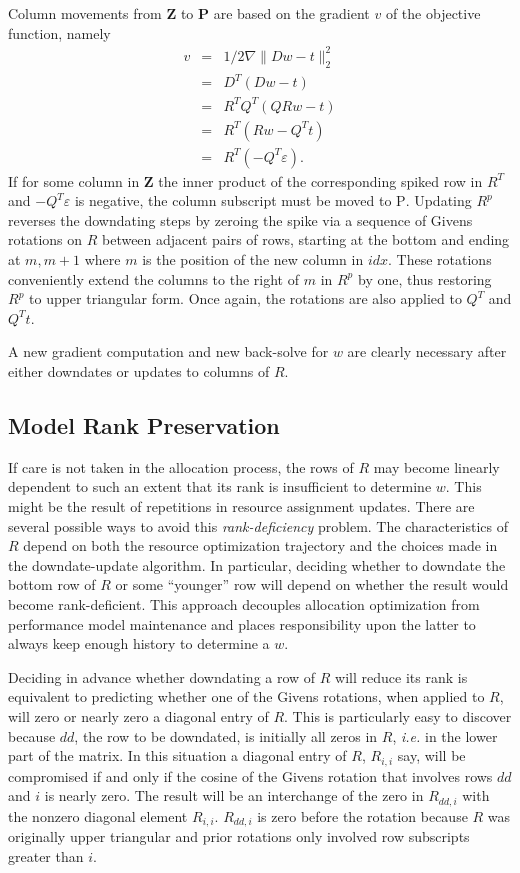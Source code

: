 Column movements from \textbf{Z} to \textbf{P} are based on the gradient $v$ of the objective function, namely
\begin{eqnarray*}
v &=& 1/2\nabla\|Dw - t\|^2_2 \\
  &=& D^T(Dw - t)             \\
  &=& R^TQ^T(QRw - t)         \\
  &=& R^T(Rw - Q^Tt)          \\
  &=& R^T(-Q^T\varepsilon).
\end{eqnarray*}
If for some column in \textbf{Z} the inner product of the corresponding spiked row in $R^T$ and $-Q^T\varepsilon$ is negative,
the column subscript must be moved to \textsc{P}.
Updating $R^p$ reverses the downdating steps by zeroing the spike via a sequence of Givens rotations on $R$
between adjacent pairs of rows, starting at the bottom and ending at $m,m+1$ where $m$ is the position of the new column in $idx$.
These rotations conveniently extend the columns to the right of $m$ in $R^p$ by one,
thus restoring $R^p$ to upper triangular form. Once again, the rotations are also applied to $Q^T$ and $Q^Tt$.

A new gradient computation and new back-solve for $w$ are clearly necessary after either downdates or updates to columns of $R$.

\subsection*{Model Rank Preservation}

If care is not taken in the allocation process,
the rows of $R$ may become linearly dependent
to such an extent that its rank is insufficient to determine $w$.
This might be the result of repetitions in resource assignment updates.
There are several possible ways to avoid this \emph{rank-deficiency} problem.
The characteristics of $R$ depend on both the resource optimization trajectory and the
choices made in the downdate-update algorithm.
In particular, deciding whether to downdate the bottom row of $R$ or some ``younger'' row
will depend on whether the result would become rank-deficient.
This approach decouples allocation optimization from performance model maintenance
and places responsibility upon the latter to always keep enough history to determine a $w$.

Deciding in advance whether downdating a row of $R$ will reduce its rank
is equivalent to predicting whether one of the Givens rotations, when applied to $R$,
will zero or nearly zero a diagonal entry of $R$.
This is particularly easy to discover because $dd$, the row to be downdated, is initially all zeros in $R$,
\emph{i.e.} in the lower part of the matrix.
In this situation a diagonal entry of $R$, $R_{i,i}$ say, will be compromised if and only if the
cosine of the Givens rotation that involves rows $dd$ and $i$ is nearly zero.
The result will be an interchange of the zero in $R_{dd,i}$ with the nonzero diagonal element $R_{i,i}$.
$R_{dd,i}$ is zero before the rotation because
$R$ was originally upper triangular and prior rotations only involved row subscripts greater than $i$.

